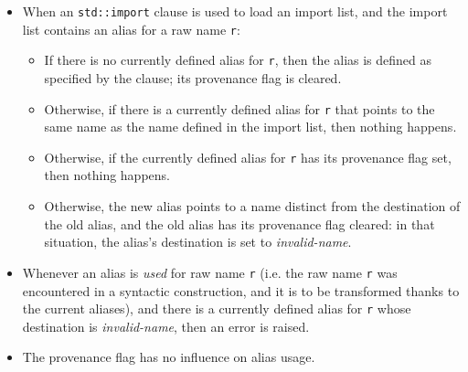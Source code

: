 \begin{itemize}
\begin{itemize}
    \end{itemize}

    \item When an \verb|std::import| clause is used to load an import
    list, and the import list contains an alias for a raw name \verb|r|:
    \begin{itemize}

        \item If there is no currently defined alias for \verb|r|, then
        the alias is defined as specified by the clause; its provenance
        flag is cleared.

        \item Otherwise, if there is a currently defined alias for
        \verb|r| that points to the same name as the name defined in
        the import list, then nothing happens.

        \item Otherwise, if the currently defined alias for \verb|r|
        has its provenance flag set, then nothing happens.

        \item Otherwise, the new alias points to a name distinct from
        the destination of the old alias, and the old alias has its
        provenance flag cleared: in that situation, the alias's
        destination is set to \emph{invalid-name}.

    \end{itemize}

    \item Whenever an alias is \emph{used} for raw name \verb|r| (i.e.
    the raw name \verb|r| was encountered in a syntactic construction,
    and it is to be transformed thanks to the current aliases), and
    there is a currently defined alias for \verb|r| whose destination
    is \emph{invalid-name}, then an error is raised.

    \item The provenance flag has no influence on alias usage.

\end{itemize}

